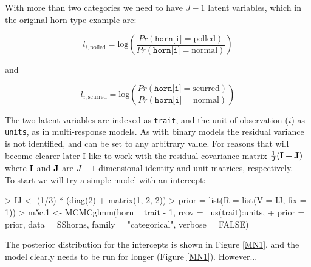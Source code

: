 \documentclass{article}
\begin{document}
With more than two categories we need to have $J-1$ latent variables, which in the original horn type example are:

\begin{equation}
l_{i,\textrm{polled}} = \textrm{log}\left(\frac{Pr(\texttt{horn[i]}=\textrm{polled})}{Pr(\texttt{horn[i]}=\textrm{normal})}\right)
\end{equation}

and 

\begin{equation}
l_{i,\textrm{scurred}} = \textrm{log}\left(\frac{Pr(\texttt{horn[i]}=\textrm{scurred})}{Pr(\texttt{horn[i]}=\textrm{normal})}\right)
\end{equation}


The two latent variables are indexed as \texttt{trait}, and the unit of observation ($i$) as \texttt{units}, as in multi-response models. As with binary models the residual variance is not identified, and can be set to any arbitrary value. For reasons that will become clearer later I like to work with the residual covariance matrix $\frac{1}{J}({\bf I}+{\bf J})$ where  ${\bf I}$ and ${\bf J}$ are $J-1$ dimensional identity and unit matrices, respectively.\\

To start we will try a simple model with an intercept:\\

\begin{Schunk}
\begin{Sinput}
> IJ <- (1/3) * (diag(2) + matrix(1, 2, 2))
> prior = list(R = list(V = IJ, fix = 1))
> m5c.1 <- MCMCglmm(horn ~ trait - 1, rcov = ~us(trait):units, 
+     prior = prior, data = SShorns, family = "categorical", verbose = FALSE)
\end{Sinput}
\end{Schunk}

The posterior distribution for the intercepts is shown in Figure \ref{MN1}, and the model clearly needs to be run for longer (Figure \ref{MN1}). However...\\
\end{document}
